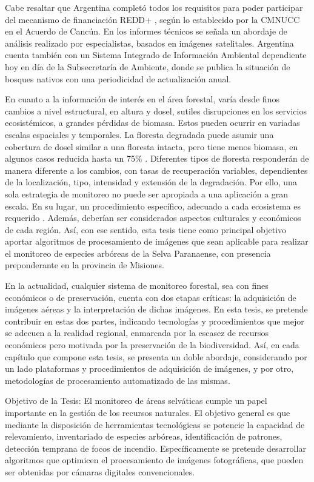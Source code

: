 Cabe resaltar que Argentina completó todos los requisitos para poder participar del mecanismo de financiación REDD+ \cite{noauthor_registro_nodate}, según lo establecido por la CMNUCC en el Acuerdo de Cancún. En los informes técnicos se señala un abordaje de análisis realizado por especialistas, basados en imágenes satelitales. Argentina cuenta también con un Sistema Integrado de Información Ambiental \cite{noauthor_inicio_nodate} dependiente hoy en día de la Subsecretaría de Ambiente, donde se publica la situación de bosques nativos con una periodicidad de actualización anual.

En cuanto a la información de interés en el área forestal, varía desde finos cambios a nivel estructural, en altura y dosel, sutiles disrupciones en los servicios ecosistémicos, a grandes pérdidas de biomasa. Estos pueden ocurrir en variadas escalas espaciales y temporales. La floresta degradada puede asumir una cobertura de dosel similar a una floresta intacta, pero tiene menos biomasa, en algunos casos reducida hasta un 75\% \cite{change_report_2006}. Diferentes tipos de floresta responderán de manera diferente a los cambios, con tasas de recuperación variables, dependientes de la localización, tipo, intensidad y extensión de la degradación. Por ello, una sola estrategia de monitoreo no puede ser apropiada a una aplicación a gran escala. En su lugar, un procedimiento específico, adecuado a cada ecosistema es requerido \cite{mitchell_current_2017}. Además, deberían ser considerados aspectos culturales y económicos de cada región. Así, con ese sentido, esta tesis tiene como principal objetivo aportar algoritmos de procesamiento de imágenes que sean aplicable para realizar el monitoreo de especies arbóreas de la Selva Paranaense, con presencia preponderante en la provincia de Misiones.

En la actualidad, cualquier sistema de monitoreo forestal, sea con fines económicos o de preservación, cuenta con dos etapas críticas: la adquisición de imágenes aéreas y la interpretación de dichas imágenes. En esta tesis, se pretende contribuir en estas dos partes, indicando tecnologías y procedimientos que mejor se adecuen a la realidad regional, enmarcada por la escasez de recursos económicos pero motivada por la preservación de la biodiversidad. Así, en cada capítulo que compone esta tesis, se presenta un doble abordaje, considerando por un lado plataformas y  procedimientos de adquisición de imágenes, y por otro, metodologías de procesamiento automatizado de las mismas.

Objetivo de la Tesis:
El monitoreo de áreas selváticas cumple un papel importante en la gestión de los recursos naturales. El objetivo general es que mediante la disposición de herramientas tecnológicas se potencie la capacidad de relevamiento, inventariado de especies arbóreas, identificación de patrones, detección temprana de focos de incendio. Específicamente se pretende desarrollar algoritmos que optimicen el procesamiento de imágenes fotográficas, que pueden ser obtenidas por cámaras digitales convencionales.


